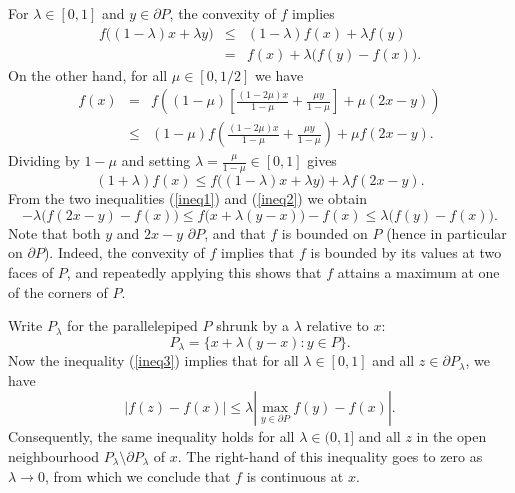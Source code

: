 \documentclass[12pt]{article}
\begin{document}
For $\lambda\in[0,1]$ and $y\in\partial P$, the convexity of $f$
implies
\begin{eqnarray}
\label{ineq1}
\nonumber
f\big((1-\lambda)x+\lambda y\big)&\le&(1-\lambda) f(x)+\lambda f(y) \\
&=&f(x)+\lambda\big(f(y)-f(x)\big).
\end{eqnarray}
On the other hand, for all $\mu\in[0,1/2]$ we have
\begin{eqnarray*}
f(x)&=&f\left((1-\mu)\left[\frac{(1-2\mu)x}{1-\mu}
+\frac{\mu y}{1-\mu}\right]+\mu(2x-y)\right) \\
&\le&(1-\mu)f\left(\frac{(1-2\mu)x}{1-\mu}
+\frac{\mu y}{1-\mu}\right)+\mu f(2x-y).
\end{eqnarray*}
Dividing by $1-\mu$ and setting $\lambda=\frac{\mu}{1-\mu}\in[0,1]$
gives
\begin{equation}
\label{ineq2}
(1+\lambda)f(x)\le f\big((1-\lambda)x+\lambda y\big)+\lambda f(2x-y).
\end{equation}
From the two inequalities (\ref{ineq1}) and (\ref{ineq2}) we obtain
\begin{equation}
\label{ineq3}
-\lambda\big(f(2x-y)-f(x)\big)\le f\big(x+\lambda(y-x)\big)-f(x)
\le\lambda\big(f(y)-f(x)\big).
\end{equation}
Note that both $y$ and $2x-y$ 
$\partial P$, and that $f$ is
bounded on $P$ (hence in particular on $\partial P$).  Indeed, the
convexity of $f$ implies that $f$ is bounded by its values at two
 faces of $P$, and repeatedly applying
this  shows
that $f$ attains a maximum at one of the corners of $P$.

Write $P_\lambda$ for the parallelepiped $P$ shrunk by a
 $\lambda$ relative to $x$:
$$
P_\lambda=\{x+\lambda(y-x)\colon y\in P\}.
$$
Now the inequality (\ref{ineq3}) implies that for all
$\lambda\in[0,1]$ and all $z\in\partial
P_\lambda$, 
we have
$$
\left\vert f(z)-f(x)\right\vert\le\lambda
\left\vert\max_{y\in\partial P} f(y)-f(x)\right\vert.
$$
Consequently, the same inequality holds for all $\lambda\in(0,1]$ and
all $z$ in the open neighbourhood $P_\lambda\setminus\partial
P_\lambda$ of $x$.  The right-hand 
of this inequality goes to
zero as $\lambda\to 0$, from which we conclude that $f$ is continuous
at $x$.
\end{document}

